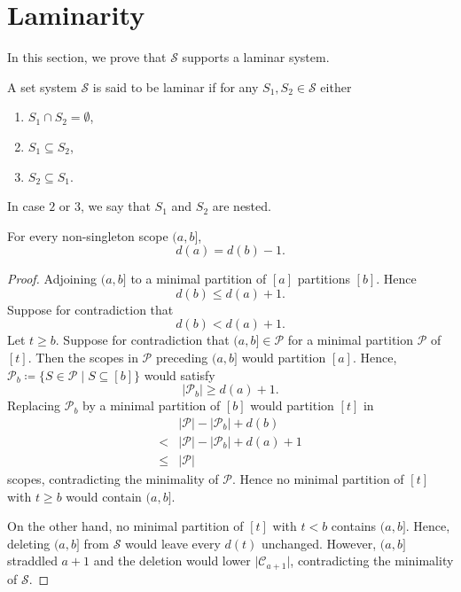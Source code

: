 \section{Laminarity} \label{sec:laminarity}
In this section, we prove that $\mathcal{S}$ supports a laminar system.
\begin{definition}[Laminarity]
    A set system $\mathcal{S}$ is said to be laminar if for any $S_1,S_2\in\mathcal{S}$ either
    \begin{enumerate}
        \item $S_1\cap S_2=\emptyset$,
        \item $S_1\subseteq S_2$,
        \item $S_2\subseteq S_1$.
    \end{enumerate}
    In case $2$ or $3$, we say that $S_1$ and $S_2$ are nested.
\end{definition}
\begin{lemma} \label{lem:shortpath}
    For every non-singleton scope $(a,b]$,
    \begin{equation*}
        d(a)=d(b)-1.
    \end{equation*}
\end{lemma}
\begin{proof}
    Adjoining $(a,b]$ to a minimal partition of $[a]$ partitions $[b]$. Hence
    \begin{equation*}
        d(b)\leq d(a)+1.
    \end{equation*}
    Suppose for contradiction that
    \begin{equation*}
        d(b)<d(a)+1.
    \end{equation*}
    Let $t\geq b$. Suppose for contradiction that $(a,b]\in\mathcal{P}$ for a minimal partition $\mathcal{P}$ of $[t]$. Then the scopes in $\mathcal{P}$ preceding $(a,b]$ would partition $[a]$. Hence, $\mathcal{P}_b\coloneqq\{S\in\mathcal{P}\mid S\subseteq[b]\}$ would satisfy
    \begin{equation*}
        \lvert\mathcal{P}_b\rvert\geq d(a)+1.
    \end{equation*}
    Replacing $\mathcal{P}_b$ by a minimal partition of $[b]$ would partition $[t]$ in
    \begin{align*}
        &\lvert\mathcal{P}\rvert-\lvert\mathcal{P}_b\rvert+d(b)\\
        <&\lvert\mathcal{P}\rvert-\lvert\mathcal{P}_b\rvert+d(a)+1\\
        \leq&\lvert\mathcal{P}\rvert
    \end{align*}
    scopes, contradicting the minimality of $\mathcal{P}$. Hence no minimal partition of $[t]$ with $t\geq b$ would contain $(a,b]$.

    On the other hand, no minimal partition of $[t]$ with $t<b$ contains $(a,b]$. Hence, deleting $(a,b]$ from $\mathcal{S}$ would leave every $d(t)$ unchanged. However, $(a,b]$ straddled $a+1$ and the deletion would lower $\lvert\mathcal{C}_{a+1}\rvert$, contradicting the minimality of $\mathcal{S}$.
\end{proof}
